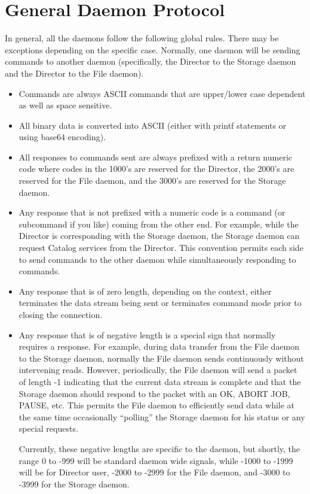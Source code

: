\section{General Daemon Protocol}

In general, all the daemons follow the following global rules. There may be
exceptions depending on the specific case. Normally, one daemon will be
sending commands to another daemon (specifically, the Director to the Storage
daemon and the Director to the File daemon).

\begin{itemize}
\item Commands are always ASCII commands that are  upper/lower case dependent
   as well as space sensitive.
\item All binary data is converted into ASCII (either with printf statements
   or  using base64 encoding).
\item All responses to commands sent are always  prefixed with a return
   numeric code where codes in the 1000's are  reserved for the Director, the
   2000's are reserved for the  File daemon, and the 3000's are reserved for the
Storage daemon.
\item Any response that is not prefixed with a numeric  code is a command (or
   subcommand if you like) coming  from the other end. For example, while the
   Director is  corresponding with the Storage daemon, the Storage daemon  can
request Catalog services from the Director. This  convention permits each side
to send commands to the  other daemon while simultaneously responding to
commands.
\item Any response that is of zero length, depending on the context,  either
   terminates the data stream being sent or terminates command mode  prior to
   closing the connection.
\item Any response that is of negative length is a special sign that  normally
   requires a response. For example, during data transfer from the  File daemon
   to the Storage daemon, normally the File daemon  sends continuously without
intervening reads. However, periodically,  the File daemon will send a packet
of length -1 indicating that  the current data stream is complete and that the
Storage  daemon should respond to the packet with an OK, ABORT JOB,  PAUSE,
etc. This permits the File daemon to efficiently send  data while at the same
time occasionally ``polling''  the Storage daemon for his status or any
special requests.

Currently, these negative lengths are specific to the daemon, but  shortly,
the range 0 to -999 will be standard daemon wide signals,  while -1000 to
-1999 will be for Director user, -2000 to -2999  for the File daemon, and
-3000 to -3999 for the Storage  daemon.
\end{itemize}

